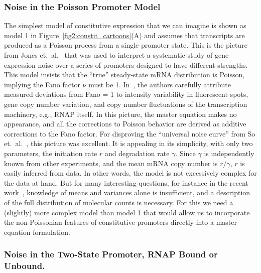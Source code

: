 \subsubsection{Noise in the Poisson Promoter Model}

The simplest model of constitutive expression that we can imagine is shown as
model 1 in Figure~\ref{fig2:constit_cartoons}(A) and assumes that transcripts are
produced as a Poisson process from a single promoter state. This is the picture
from Jones et.\ al.~\cite{Jones2014} that was used to interpret a systematic
study of gene expression noise over a series of promoters designed to have
different strengths. This model insists that the ``true'' steady-state mRNA
distribution is Poisson, implying the Fano factor $\nu$ must be 1.
In~\cite{Jones2014}, the authors carefully attribute measured deviations from
Fano = 1 to intensity variability in fluorescent spots, gene copy number
variation, and copy number fluctuations of the transcription machinery, e.g.,
RNAP itself. In this picture, the master equation makes no appearance, and all
the corrections to Poisson behavior are derived as additive corrections to the
Fano factor. For disproving the ``universal noise curve'' from So et.\
al.~\cite{So2011}, this picture was excellent. It is appealing in its simplicity,
with only two parameters, the initiation rate $r$ and degradation rate $\gamma$.
Since $\gamma$ is independently known from other experiments, and the mean mRNA
copy number is $r/\gamma$, $r$ is easily inferred from data. In other words, the
model is not excessively complex for the data at hand. But for many interesting
questions, for instance in the recent work~\cite{Razo-Mejia2020}, knowledge of
means and variances alone is insufficient, and a description of the full
distribution of molecular counts is necessary. For this we need a (slightly)
more complex model than model 1 that would allow us to incorporate the
non-Poissonian features of constitutive promoters directly into a master
equation formulation.

\subsubsection{Noise in the Two-State Promoter, RNAP Bound or Unbound.}

